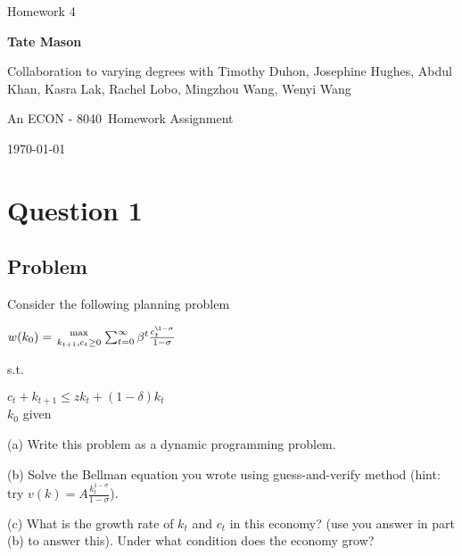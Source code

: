 \documentclass[10pt, a4paper]{article}
\newcommand\course{ECON - 8040}                            %
\newcommand\hwnumber{ 4}                                 %
\newcommand\Information{Tate Mason}                        %
\begin{document}
  \begin{titlepage}
    \begin{center}
      \vspace*{3cm}
            
        \vspace{1cm}
        \huge
        Homework \hwnumber
            
        \vspace{1.5cm}
        \Large
            
        \textbf{\Information}                      %
            
        \vfill
        Collaboration to varying degrees with Timothy Duhon, Josephine Hughes, Abdul Khan, Kasra Lak, Rachel Lobo, Mingzhou Wang, Wenyi Wang
        
        \vspace{1cm}

        An \course \ Homework Assignment
            
        \vspace{1cm}
        \Large

        
        \today
            
    \end{center}
  \end{titlepage}

  \newpage
\section{Question 1}
  \subsection{Problem}
    Consider the following planning problem
    \begin{center}
      $w(k_0)={\max\atop{k_{t+1}, c_t\geq0}}\sum_{t=0}^{\infty}\beta^t\frac{c_t^{\1-\sigma}}{1-\sigma}$
    \end{center}
    s.t.
    \begin{center}
      $c_t+k_{t+1}\leq zk_t+(1-\delta)k_t$  \\
      $k_0$ given 
    \end{center}

    (a) Write this problem as a dynamic programming problem.

    (b) Solve the Bellman equation you wrote using guess-and-verify method (hint: try $v(k)=A\frac{k_t^{1-\sigma}}{1-\sigma}$).

    (c) What is the growth rate of $k_t$ and $c_t$ in this economy? (use you answer in part (b) to answer this). Under what condition does the economy grow?
\end{document}
